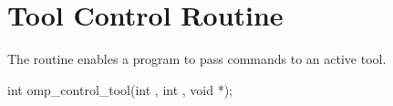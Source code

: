 %
%
%
%
%
%
%
%
%
%
%
%
%

\clearpage  %
\section{Tool Control Routine}
\label{sec:control_tool}

\summary
The  routine enables a program to
pass commands to an active tool.

\format
\begin{ccppspecific}
\begin{ompcFunction}
int omp_control_tool(int , int , void *);
\end{ompcFunction}
\end{ccppspecific}

